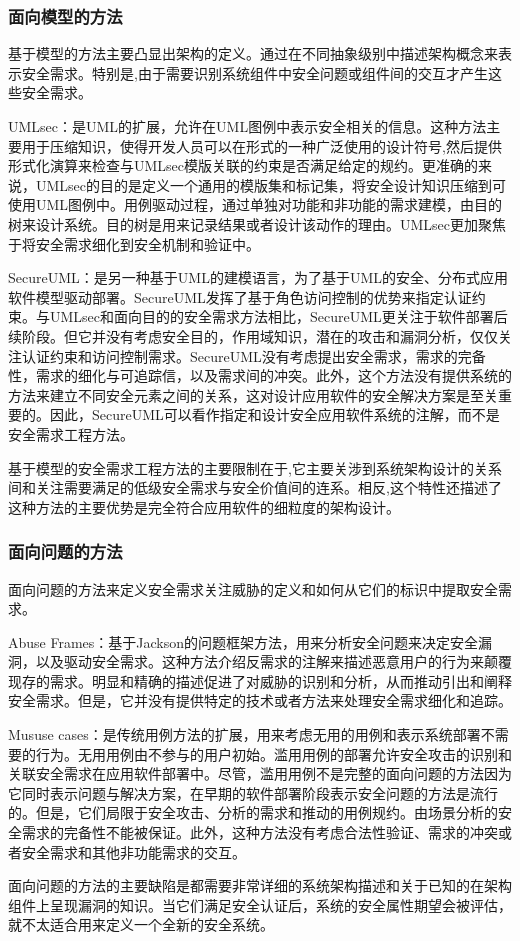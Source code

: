 \subsubsection{面向模型的方法}
\par
基于模型的方法主要凸显出架构的定义。通过在不同抽象级别中描述架构概念来表示安全需求。特别是,由于需要识别系统组件中安全问题或组件间的交互才产生这些安全需求。
\par
UMLsec：是UML的扩展，允许在UML图例中表示安全相关的信息。这种方法主要用于压缩知识，使得开发人员可以在形式的一种广泛使用的设计符号,然后提供形式化演算来检查与UMLsec模版关联的约束是否满足给定的规约。更准确的来说，UMLsec的目的是定义一个通用的模版集和标记集，将安全设计知识压缩到可使用UML图例中。用例驱动过程，通过单独对功能和非功能的需求建模，由目的树来设计系统。目的树是用来记录结果或者设计该动作的理由。UMLsec更加聚焦于将安全需求细化到安全机制和验证中。
\par
SecureUML：是另一种基于UML的建模语言，为了基于UML的安全、分布式应用软件模型驱动部署。SecureUML发挥了基于角色访问控制的优势来指定认证约束。与UMLsec和面向目的的安全需求方法相比，SecureUML更关注于软件部署后续阶段。但它并没有考虑安全目的，作用域知识，潜在的攻击和漏洞分析，仅仅关注认证约束和访问控制需求。SecureUML没有考虑提出安全需求，需求的完备性，需求的细化与可追踪信，以及需求间的冲突。此外，这个方法没有提供系统的方法来建立不同安全元素之间的关系，这对设计应用软件的安全解决方案是至关重要的。因此，SecureUML可以看作指定和设计安全应用软件系统的注解，而不是安全需求工程方法。
\par
基于模型的安全需求工程方法的主要限制在于,它主要关涉到系统架构设计的关系间和关注需要满足的低级安全需求与安全价值间的连系。相反,这个特性还描述了这种方法的主要优势是完全符合应用软件的细粒度的架构设计。
\subsubsection{面向问题的方法}
\par
面向问题的方法来定义安全需求关注威胁的定义和如何从它们的标识中提取安全需求。
\par
Abuse Frames：基于Jackson的问题框架方法，用来分析安全问题来决定安全漏洞，以及驱动安全需求。这种方法介绍反需求的注解来描述恶意用户的行为来颠覆现存的需求。明显和精确的描述促进了对威胁的识别和分析，从而推动引出和阐释安全需求。但是，它并没有提供特定的技术或者方法来处理安全需求细化和追踪。
\par
Mususe cases：是传统用例方法的扩展，用来考虑无用的用例和表示系统部署不需要的行为。无用用例由不参与的用户初始。滥用用例的部署允许安全攻击的识别和关联安全需求在应用软件部署中。尽管，滥用用例不是完整的面向问题的方法因为它同时表示问题与解决方案，在早期的软件部署阶段表示安全问题的方法是流行的。但是，它们局限于安全攻击、分析的需求和推动的用例规约。由场景分析的安全需求的完备性不能被保证。此外，这种方法没有考虑合法性验证、需求的冲突或者安全需求和其他非功能需求的交互。
\par
面向问题的方法的主要缺陷是都需要非常详细的系统架构描述和关于已知的在架构组件上呈现漏洞的知识。当它们满足安全认证后，系统的安全属性期望会被评估，就不太适合用来定义一个全新的安全系统。
